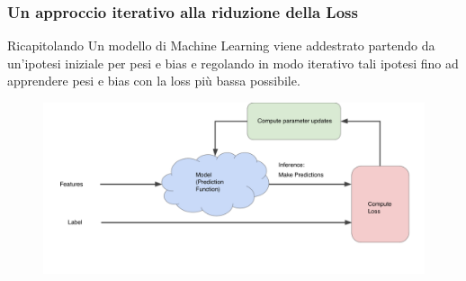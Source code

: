 \begin{frame}

	\frametitle{Un approccio iterativo alla riduzione della Loss}

	\begin{block}{Ricapitolando}
		Un modello di Machine Learning viene addestrato partendo da un'ipotesi iniziale per pesi e bias e regolando in modo iterativo tali ipotesi fino ad apprendere pesi e bias con la loss più bassa possibile.
		\begin{figure}[!htbp]
			\centering
			\includegraphics[width=0.9\linewidth]{images/supervised/training_reducing_loss/GradientDescentDiagram.pdf}
		\end{figure}

	\end{block}

\end{frame}




